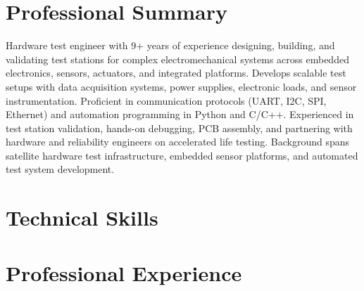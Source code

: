 \documentclass[letterpaper,11pt]{moderncv}
\begin{document}
\makecvtitle
\vspace{-3em}

\section{Professional Summary}
Hardware test engineer with 9+ years of experience designing, building, and validating test stations for complex electromechanical systems across embedded electronics, sensors, actuators, and integrated platforms. Develops scalable test setups with data acquisition systems, power supplies, electronic loads, and sensor instrumentation. Proficient in communication protocols (UART, I2C, SPI, Ethernet) and automation programming in Python and C/C++. Experienced in test station validation, hands-on debugging, PCB assembly, and partnering with hardware and reliability engineers on accelerated life testing. Background spans satellite hardware test infrastructure, embedded sensor platforms, and automated test system development.

\section{Technical Skills}
\begin{minipage}[t]{0.48\textwidth}
\end{minipage}%
\hfill
\begin{minipage}[t]{0.48\textwidth}
\end{minipage}

\section{Professional Experience}
\end{document}
